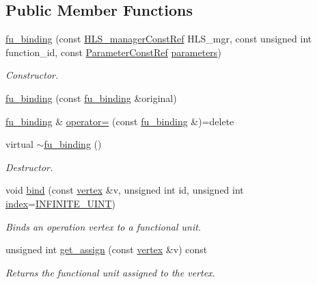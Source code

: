 \subsection*{Public Member Functions}
\begin{DoxyCompactItemize}
\item 
\hyperlink{classfu__binding_ae6f6e61df5b1e24b034cd0907570557d}{fu\+\_\+binding} (const \hyperlink{hls__manager_8hpp_a1b481383e3beabc89bd7562ae672dd8c}{H\+L\+S\+\_\+manager\+Const\+Ref} H\+L\+S\+\_\+mgr, const unsigned int function\+\_\+id, const \hyperlink{Parameter_8hpp_a37841774a6fcb479b597fdf8955eb4ea}{Parameter\+Const\+Ref} \hyperlink{classfu__binding_aa372286fd7ddc5ce6424afba333bb80a}{parameters})
\begin{DoxyCompactList}\small\item\em Constructor. \end{DoxyCompactList}\item 
\hyperlink{classfu__binding_ad3c9159e25572998ed6811545486ed2f}{fu\+\_\+binding} (const \hyperlink{classfu__binding}{fu\+\_\+binding} \&original)
\item 
\hyperlink{classfu__binding}{fu\+\_\+binding} \& \hyperlink{classfu__binding_a4265728bc9c78559b1bc881119eb5fdc}{operator=} (const \hyperlink{classfu__binding}{fu\+\_\+binding} \&)=delete
\item 
virtual \hyperlink{classfu__binding_a95e352799ea02609e978752ade999c22}{$\sim$fu\+\_\+binding} ()
\begin{DoxyCompactList}\small\item\em Destructor. \end{DoxyCompactList}\item 
void \hyperlink{classfu__binding_af75163b4c31b19bb12cc240464978692}{bind} (const \hyperlink{graph_8hpp_abefdcf0544e601805af44eca032cca14}{vertex} \&v, unsigned int id, unsigned int \hyperlink{tutorial__pact__2019_2Introduction_2third_2include_2Keccak_8h_a028c9bdc8344cca38ab522a337074797}{index}=\hyperlink{utility_8hpp_ae4a0a0a85307da3a97949c865610c21b}{I\+N\+F\+I\+N\+I\+T\+E\+\_\+\+U\+I\+NT})
\begin{DoxyCompactList}\small\item\em Binds an operation vertex to a functional unit. \end{DoxyCompactList}\item 
unsigned int \hyperlink{classfu__binding_af7ec91c33961d791fc2b977fd3b119bd}{get\+\_\+assign} (const \hyperlink{graph_8hpp_abefdcf0544e601805af44eca032cca14}{vertex} \&v) const
\begin{DoxyCompactList}\small\item\em Returns the functional unit assigned to the vertex. \end{DoxyCompactList}\item 

\end{DoxyCompactItemize}
